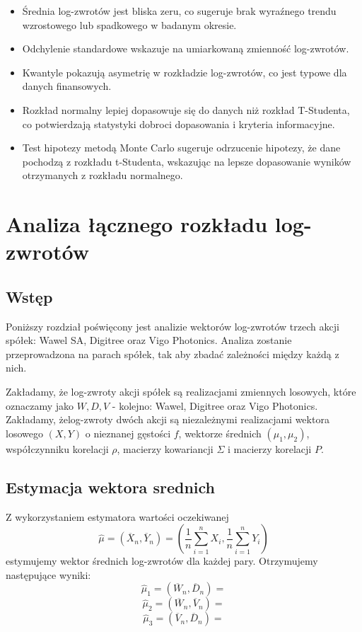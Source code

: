 \documentclass[a4paper,11pt]{article}
\begin{document}
\begin{itemize}
    \item Średnia log-zwrotów jest bliska zeru, co sugeruje brak wyraźnego trendu wzrostowego lub spadkowego w badanym okresie.
    \item Odchylenie standardowe wskazuje na umiarkowaną zmienność log-zwrotów.
    \item Kwantyle pokazują asymetrię w rozkładzie log-zwrotów, co jest typowe dla danych finansowych.
    \item Rozkład normalny lepiej dopasowuje się do danych niż rozkład T-Studenta, co potwierdzają statystyki dobroci dopasowania i kryteria informacyjne.
    \item Test hipotezy metodą Monte Carlo sugeruje odrzucenie hipotezy, że dane pochodzą z rozkładu t-Studenta, wskazując na lepsze dopasowanie wyników otrzymanych z rozkładu normalnego.
\end{itemize}

\newpage\section{Analiza łącznego rozkładu log-zwrotów}

\subsection{Wstęp}
Poniższy rozdział poświęcony jest analizie wektorów log-zwrotów trzech akcji spółek: Wawel SA, Digitree oraz Vigo Photonics. Analiza zostanie przeprowadzona na parach spółek, tak aby zbadać zależności między każdą z nich.

Zakładamy, że log-zwroty akcji spółek są realizacjami zmiennych losowych, które oznaczamy jako $W, D, V$ - kolejno: Wawel, Digitree oraz Vigo Photonics. Zakładamy, żelog-zwroty dwóch akcji są niezależnymi realizacjami wektora losowego $(X,Y)$ o nieznanej gęstości $f$, wektorze średnich $(\mu_1,\mu_2)$, współczynniku korelacji $\rho$, macierzy kowariancji $\Sigma$ i macierzy korelacji $P$.

\subsection{Estymacja wektora srednich}
Z wykorzystaniem estymatora wartości oczekiwanej
$$\hat{\mu}=(\overline{X}_n, \overline{Y}_n) = (\frac{1}{n}\sum_{i=1}^{n}X_i, \frac{1}{n}\sum_{i=1}^{n}Y_i)$$
estymujemy wektor średnich log-zwrotów dla każdej pary. Otrzymujemy następujące wyniki:
$$\hat{\mu}_1=(\overline{W}_n, \overline{D}_n) =$$
$$\hat{\mu}_2=(\overline{W}_n, \overline{V}_n) =$$
$$\hat{\mu}_3=(\overline{V}_n, \overline{D}_n) =$$
\end{document}
